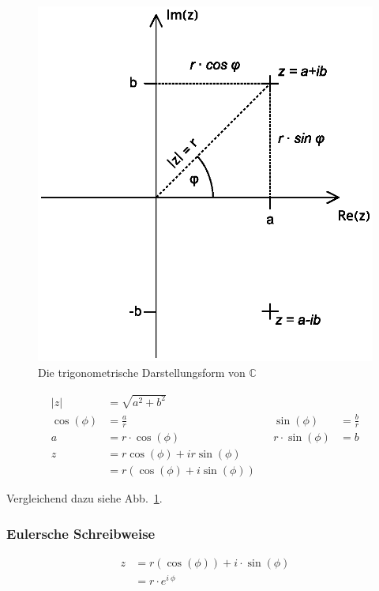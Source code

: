 \begin{figure}
	\centering
	\includegraphics[scale=0.5]{grafiken/Komplexe_Zahlen_Herleitung}
	\caption{Die trigonometrische Darstellungsform von \(\mathbb{C}\)}\label{fig:trigonometrische_form}
\end{figure}

\[
	\begin{alignedat}{3}
		\vert z \vert &=\sqrt{a^2+b^2} \\
		\cos(\phi) &= \frac{a}{r} && \sin(\phi) &= \frac{b}{r} \\
		a &= r \cdot \cos(\phi) && r \cdot \sin(\phi) &= b \\
		z &= r \cos(\phi) + i r \sin(\phi) \\
		&= r (\cos(\phi) + i \sin(\phi))
	\end{alignedat}
\]

Vergleichend dazu siehe Abb.~\ref{fig:trigonometrische_form}.

\subsubsection{Eulersche Schreibweise}


\begin{align*}
	z & = r (\cos(\phi)) + i \cdot \sin(\phi) \\
	  & = r \cdot e^{i\ \phi}
\end{align*}

